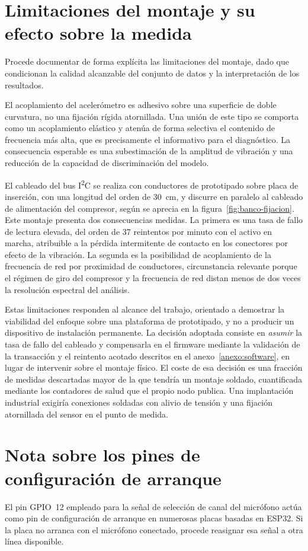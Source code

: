 \section{Limitaciones del montaje y su efecto sobre la medida}

Procede documentar de forma explícita las limitaciones del montaje, dado que condicionan la
calidad alcanzable del conjunto de datos y la interpretación de los resultados.

El acoplamiento del acelerómetro es adhesivo sobre una superficie de doble curvatura, no una
fijación rígida atornillada. Una unión de este tipo se comporta como un acoplamiento elástico y
atenúa de forma selectiva el contenido de frecuencia más alta, que es precisamente el
informativo para el diagnóstico. La consecuencia esperable es una subestimación de la
amplitud de vibración y una reducción de la capacidad de discriminación del modelo.

El cableado del bus I\textsuperscript{2}C se realiza con conductores de prototipado sobre
placa de inserción, con una longitud del orden de \mbox{30 cm}, y discurre en paralelo al
cableado de alimentación del compresor, según se aprecia en la
figura~\ref{fig:banco-fijacion}. Este montaje presenta dos consecuencias medidas. La primera
es una tasa de fallo de lectura elevada, del orden de 37 reintentos por minuto con el activo
en marcha, atribuible a la pérdida intermitente de contacto en los conectores por efecto de
la vibración. La segunda es la posibilidad de acoplamiento de la frecuencia de red por
proximidad de conductores, circunstancia relevante porque el régimen de giro del compresor y
la frecuencia de red distan menos de dos veces la resolución espectral del análisis.

Estas limitaciones responden al alcance del trabajo, orientado a demostrar la viabilidad del
enfoque sobre una plataforma de prototipado, y no a producir un dispositivo de instalación
permanente. La decisión adoptada consiste en \textit{asumir} la tasa de fallo del cableado y
compensarla en el firmware mediante la validación de la transacción y el reintento acotado descritos en el anexo~\ref{anexo:software}, en lugar de intervenir sobre el montaje físico. El
coste de esa decisión es una fracción de medidas descartadas mayor de la que tendría un
montaje soldado, cuantificada mediante los contadores de salud que el propio nodo publica.
Una implantación industrial exigiría conexiones soldadas con alivio de tensión y una fijación
atornillada del sensor en el punto de medida.

\section{Nota sobre los pines de configuración de arranque}

El pin GPIO~12 empleado para la señal de selección de canal del micrófono actúa como pin de
configuración de arranque en numerosas placas basadas en ESP32. Si la placa no arranca con
el micrófono conectado, procede reasignar esa señal a otra línea disponible.
